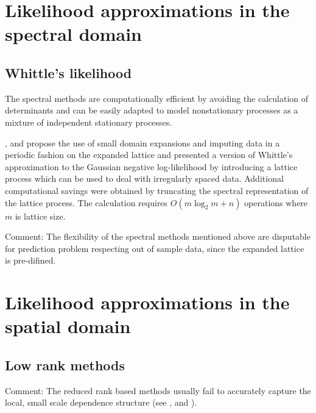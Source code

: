 \documentclass[
12pt, %
a4paper, %
oneside, %
headinclude,footinclude, %
BCOR5mm, %
]{scrartcl}
\begin{document}
\section{Likelihood approximations in the spectral domain}
\subsection{Whittle’s likelihood}

The spectral methods are computationally efficient by avoiding the calculation of determinants and can be easily adapted to model nonstationary processes as a mixture of independent stationary processes.

\href{https://chenyw68.github.io/Literature/[2007]Approximate Likelihood for Large Irregularly Spaced Spatial Data.pdf}{\cite{fuentes2007approximate}}, \href{https://chenyw68.github.io/Literature/[2020]Spectral Density Estimation for Random Fields via Periodic Embeddings.pdf}{\citep{guinness2019spectral}} and \href{https://chenyw68.github.io/Literature/[2017]Circulant Embedding of Approximate Covariances for Inference From Gaussian Data.pdf}{\citep{guinness2017circulant}} propose the use of small domain expansions and imputing data in a periodic fashion on the expanded lattice and  presented a version of Whittle’s approximation to the Gaussian negative log-likelihood by introducing a lattice process which can be used to deal with irregularly spaced data. Additional computational savings were obtained by truncating the spectral representation of the lattice process. The calculation requires $O(m \log_2 m + n)$ operations where $m$ is lattice size. 

\textcolor[rgb]{1.00,0.00,1.00}{Comment:}
The flexibility of the spectral methods mentioned above are disputable for prediction problem respecting out of sample data, since the expanded lattice is pre-difined.

\section{Likelihood approximations in the spatial domain}
\subsection{Low rank methods}
\textcolor[rgb]{1.00,0.00,1.00}{Comment:}
The reduced rank based methods usually fail to accurately capture the local, small scale dependence structure (see \href{https://chenyw68.github.io/Literature/[2012]A full scale approximation of covariance functions for large spatial data sets.pdf}{\citep{sang2012full}}, \href{https://chenyw68.github.io/Literature/[2008]A modeling approach for large spatial datasets.pdf}{\citep{stein2008modeling}} and \href{https://chenyw68.github.io/Literature/[2009]Improving the performance of predictive process modeling for large datasets.pdf}{\citep{finley2009improving}}).
\end{document}
